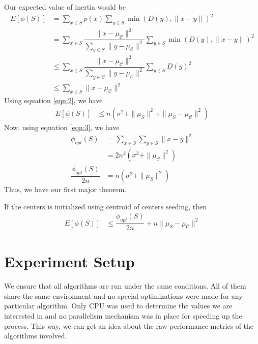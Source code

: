 \documentclass[twoside, 11pt]{article}
\newcommand{\C}{\mathcal{C}}
\begin{document}
	Our expected value of inertia would be
		\begin{align*}
			E[\phi(S)] & = \sum_{x\in S}p(x)\sum_{y\in S}\min(D(y),\|x-y\|)^2\\
					   & = \sum_{x\in S}\dfrac{\|x-\mu_{\C}\|^2}{\sum_{y\in S}\|y-\mu_{\C}\|^2}\sum_{y\in S}\min(D(y),\|x-y\|)^2\\
					   & \leq \sum_{x\in S}\dfrac{\|x-\mu_{\C}\|^2}{\sum_{y\in S}\|y-\mu_{\C}\|^2}\sum_{y\in S}D(y)^2\\
					   & \leq \sum_{x\in S}\|x-\mu_{\C}\|^2
		\end{align*}
	Using equation \eqref{eqn:2}, we have
		\begin{align*}
			E[\phi(S)] & \leq n(\sigma^2+\|\mu_S\|^2+\|\mu_S-\mu_{\C}\|^2)
		\end{align*}
	Now, using equation \eqref{eqn:3}, we have
		\begin{align*}
			\phi_{opt}(S) & = \sum_{x\in S}\sum_{y\in S}\|x-y\|^2\\
						  & = 2n^2(\sigma^2+\|\mu_{S}\|^2)\\
			\dfrac{\phi_{opt}(S)}{2n} & = n(\sigma^2+\|\mu_{S}\|^2)
		\end{align*}
	Thus, we have our first major theorem.
		\begin{theorem}
			If the centers is initialized using centroid of centers seeding, then
				\begin{align*}
					E[\phi(S)] & \leq \dfrac{\phi_{opt}(S)}{2n}+n\|\mu_{S}-\mu_{\C}\|^2
				\end{align*}
		\end{theorem}
				
	\section{Experiment Setup}
	We ensure that all algorithms are run under the same conditions. All of them share the same environment and no special optimizations were made for any particular algorithm. Only CPU was used to determine the values we are interested in and no parallelism mechanism was in place for speeding up the process. This way, we can get an idea about the raw performance metrics of the algorithms involved.
	
\end{document}
